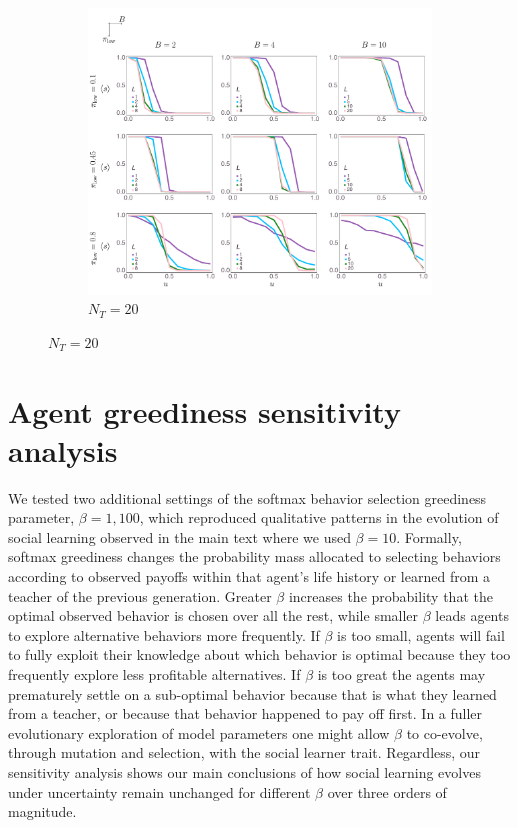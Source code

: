 \documentclass[letterpaper,11.5pt]{scrartcl}
\begin{document}
\begin{figure}
  \ContinuedFloat
  \begin{subfigure}{\textwidth}
	\caption{$N_T = 20$}
	\includegraphics[width=\textwidth]{Figures/supplement/nteachers=20/mainResultsPlots.pdf}
  \end{subfigure}
\end{figure}

\clearpage


\section{Agent greediness sensitivity analysis} 

We tested two additional settings of the softmax behavior selection greediness parameter,
$\beta=1,100$, which reproduced qualitative patterns in the evolution of social learning
observed in the main text where we used $\beta=10$.  
Formally, softmax greediness changes the 
probability mass allocated to selecting behaviors according to observed payoffs within that agent's
life history or learned from a teacher of the previous generation. 
Greater $\beta$ increases the probability that the optimal
observed behavior is chosen over all the rest, while smaller $\beta$ leads agents to explore alternative behaviors more frequently. If $\beta$ is too small, agents will fail to
fully exploit their knowledge about which behavior is optimal because they too frequently
explore less profitable alternatives.  If $\beta$ is too great the agents may prematurely
settle on a sub-optimal behavior because that is what they learned from a teacher, 
or because that behavior happened to pay off first. In a fuller evolutionary
exploration of model parameters one might allow $\beta$ to co-evolve, through
mutation and selection, with the social learner trait.  
Regardless, our sensitivity analysis shows our main conclusions of how social learning evolves under uncertainty remain unchanged for different $\beta$ over three orders of magnitude.
\end{document}
